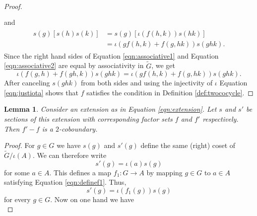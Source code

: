 \documentclass{dcthesis}
\newcommand{\mm}[1]{{\color{blue} \sf MM: [#1]}}
\newcommand{\wt}[1]{\widetilde{#1}}
\newtheorem{lemma}[prop]{Lemma}
\theoremstyle{definition}
\theoremstyle{remark}
\numberwithin{equation}{section}
\numberwithin{figure}{section}
\begin{document}
{{\begin{proof}
\begin{align}
\begin{split}
        \end{split}
      \end{align}
      and
      \begin{align}
        \label{eqn:associative2}
        \begin{split}
          s(g)[s(h)s(k)] &= s(g)[\iota(f(h,k))s(hk)]\\
                         &= \iota(gf(h,k)+f(g,hk))s(ghk).
        \end{split}
      \end{align}
      Since the right hand sides of Equation
      \ref{eqn:associative1}
      and
      Equation
      \ref{eqn:associative2}
      are equal
      by associativity in $\wt{G}$,
      we get
      \begin{equation}
        \label{eqn:justiota}
        \iota(f(g,h)+f(gh,k))s(ghk)
        =
        \iota(gf(h,k)+f(g,hk))s(ghk).
      \end{equation}
      After canceling $s(ghk)$ from both sides
      and using the injectivity of $\iota$
      Equation \ref{eqn:justiota}
      shows that $f$ satisfies the condition in
      Definition
      \ref{def:twococycle}.
    \end{proof}
    \begin{lemma}
      \label{lem:choiceofsectioncoboundary}
      Consider an extension as in Equation \ref{eqn:extension}.
      Let $s$ and $s'$ be sections of this extension
      with corresponding factor sets $f$ and $f'$
      respectively.
      Then $f'-f$ is a $2$-coboundary.
    \end{lemma}
    \begin{proof}
      For $g\in G$ we have
      $s(g)$ and $s'(g)$ define the same (right) coset of
      $\wt{G}/\iota(A)$.
      We can therefore write
      \begin{equation}
        \label{eqn:definef1}
        s'(g) = \iota(a)s(g)
      \end{equation}
      for some $a\in A$.
      This defines a map
      $f_1\colon G\to A$
      by mapping $g\in G$ to $a\in A$
      satisfying
      Equation \ref{eqn:definef1}.
      Thus,
      \begin{equation}
        \label{eqn:definef1again}
        s'(g)=\iota(f_1(g))s(g)
      \end{equation}
      for every $g\in G$.
      Now on one hand we have
      \begin{equation}

\end{equation}
\end{proof}}}
\end{document}
